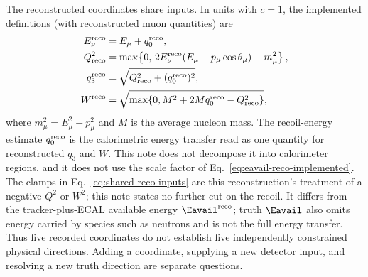 The reconstructed coordinates share inputs. In units with $c=1$, the implemented definitions (with reconstructed muon quantities) are
\begin{align}
 E_\nu^{\rm reco} &= E_\mu+q_0^{\rm reco},\nonumber\\
 Q^2_{\rm reco} &= \max\!\left\{0,\,
 2E_\nu^{\rm reco}(E_\mu-p_\mu\cos\theta_\mu)
 -m_\mu^2\right\},\nonumber\\
 q_3^{\rm reco} &= \sqrt{Q^2_{\rm reco}+(q_0^{\rm reco})^2},\nonumber\\
 W^{\rm reco} &= \sqrt{\max\{0,M^2+2Mq_0^{\rm reco}-Q^2_{\rm reco}\}},
 \label{eq:shared-reco-inputs}
\end{align}
where $m_\mu^2=E_\mu^2-p_\mu^2$ and $M$ is the average nucleon mass. The recoil-energy estimate $q_0^{\rm reco}$ is the calorimetric energy transfer read as one quantity for reconstructed $q_3$ and $W$. This note does not decompose it into calorimeter regions, and it does not use the scale factor of Eq.~\eqref{eq:eavail-reco-implemented}. The clamps in Eq.~\eqref{eq:shared-reco-inputs} are this reconstruction's treatment of a negative $Q^2$ or $W^2$; this note states no further cut on the recoil. It differs from the tracker-plus-ECAL available energy $\Eavail^{\rm reco}$; truth $\Eavail$ also omits energy carried by species such as neutrons and is not the full energy transfer. Thus five recorded coordinates do not establish five independently constrained physical directions. Adding a coordinate, supplying a new detector input, and resolving a new truth direction are separate questions.
